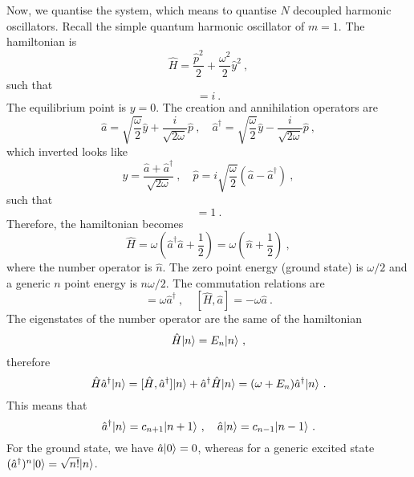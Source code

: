     Now, we quantise the system, which means to quantise $N$ decoupled harmonic oscillators. Recall the simple quantum harmonic oscillator of $m = 1$. The hamiltonian is 
    \begin{equation*}
        \hat H = \frac{\hat p^2}{2} + \frac{\omega^2}{2} \hat y^2 ~,
    \end{equation*}
    such that 
    \begin{equation*}
        [\hat y, \hat p] = i ~.
    \end{equation*}
    The equilibrium point is $y = 0$. The creation and annihilation operators are 
    \begin{equation*}
        \hat a = \sqrt{\frac{\omega}{2}} \hat y + \frac{i}{\sqrt{2\omega}} \hat p ~, \quad \hat a^\dagger = \sqrt{\frac{\omega}{2}} \hat y - \frac{i}{\sqrt{2\omega}} \hat p ~,
    \end{equation*}
    which inverted looks like 
    \begin{equation*}
        \hat y = \frac{\hat a + \hat a^\dagger}{\sqrt{2 \omega}} ~, \quad \hat p = i \sqrt{\frac{\omega}{2}} (\hat a - \hat a^\dagger) ~,
    \end{equation*}
    such that 
    \begin{equation*}
        [\hat a, \hat a^\dagger] = 1~.
    \end{equation*}
    Therefore, the hamiltonian becomes 
    \begin{equation*}
        \hat H = \omega (\hat a^\dagger \hat a + \frac{1}{2}) = \omega (\hat n + \frac{1}{2}) ~,
    \end{equation*}
    where the number operator is $\hat n$. The zero point energy (ground state) is $\omega/2$ and a generic $n$ point energy is $n \omega /2$. The commutation relations are
    \begin{equation*}
        [\hat H, \hat a^\dagger] = \omega \hat a^\dagger ~, \quad [\hat H, \hat a] = - \omega \hat a ~.
    \end{equation*}
    The eigenstates of the number operator are the same of the hamiltonian 
    \begin{equation*}
        \hat H \vert n\rangle = E_{n} \vert n\rangle ~,
    \end{equation*}
    therefore 
    \begin{equation*}
        \hat H \hat a^\dagger \vert n\rangle = [\hat H, \hat a^\dagger] \vert n\rangle + \hat a^\dagger \hat H \vert n\rangle = (\omega + E_n) \hat a^\dagger \vert n\rangle ~.
    \end{equation*}
    This means that 
    \begin{equation*}
        \hat a^\dagger \vert n\rangle = c_{n+1} \vert n+1\rangle ~, \quad \hat a \vert n\rangle = c_{n-1} \vert n-1\rangle ~.
    \end{equation*}
    For the ground state, we have $\hat a \vert0\rangle = 0$, whereas for a generic excited state $(\hat a^\dagger)^n \vert0\rangle = \sqrt{n!} \vert n\rangle$.

